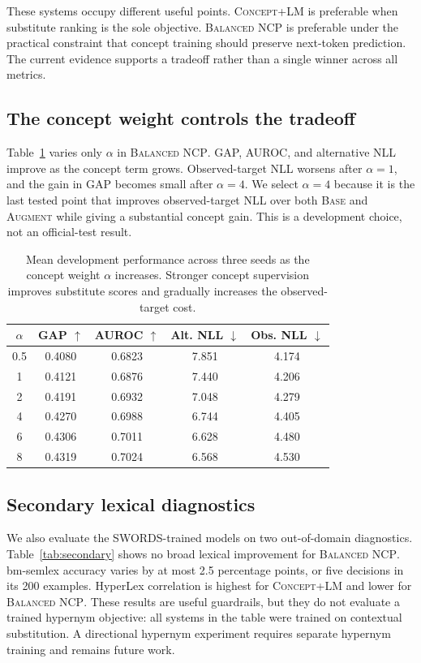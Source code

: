 \documentclass[11pt]{article}
\newcommand{\base}{\textsc{Base}}
\newcommand{\aug}{\textsc{Augment}}
\newcommand{\pcode}{\textsc{Concept+LM}}
\newcommand{\method}{\textsc{Balanced NCP}}
\begin{document}
These systems occupy different useful points. \pcode{} is preferable when
substitute ranking is the sole objective. \method{} is preferable under the
practical constraint that concept training should preserve next-token
prediction. The current evidence supports a tradeoff rather than a single winner
across all metrics.

\subsection{The concept weight controls the tradeoff}
\label{sec:alpha}

Table~\ref{tab:alpha} varies only $\alpha$ in \method{}. GAP, AUROC, and
alternative NLL improve as the concept term grows. Observed-target NLL worsens
after $\alpha=1$, and the gain in GAP becomes small after $\alpha=4$. We select
$\alpha=4$ because it is the last tested point that improves observed-target NLL
over both \base{} and \aug{} while giving a substantial concept gain. This is a
development choice, not an official-test result.

\begin{table}[t]
\centering\small\setlength{\tabcolsep}{4pt}
\begin{tabular}{ccccc}
\toprule
$\alpha$ & GAP $\uparrow$ & AUROC $\uparrow$ & Alt. NLL $\downarrow$ & Obs. NLL $\downarrow$ \\
\midrule
0.5 & 0.4080 & 0.6823 & 7.851 & 4.174 \\
1 & 0.4121 & 0.6876 & 7.440 & 4.206 \\
2 & 0.4191 & 0.6932 & 7.048 & 4.279 \\
4 & 0.4270 & 0.6988 & 6.744 & 4.405 \\
6 & 0.4306 & 0.7011 & 6.628 & 4.480 \\
8 & 0.4319 & 0.7024 & 6.568 & 4.530 \\
\bottomrule
\end{tabular}
\caption{Mean development performance across three seeds as the concept weight
$\alpha$ increases. Stronger concept supervision improves substitute scores and
gradually increases the observed-target cost.}
\label{tab:alpha}
\end{table}

\subsection{Secondary lexical diagnostics}

We also evaluate the SWORDS-trained models on two out-of-domain diagnostics.
Table~\ref{tab:secondary} shows no broad lexical improvement for \method{}.
bm-semlex accuracy varies by at most 2.5 percentage points, or five decisions in
its 200 examples. HyperLex correlation is highest for \pcode{} and lower for
\method{}. These results are useful guardrails, but they do not evaluate a
trained hypernym objective: all systems in the table were trained on contextual
substitution. A directional hypernym experiment requires separate hypernym
training and remains future work.
\end{document}
